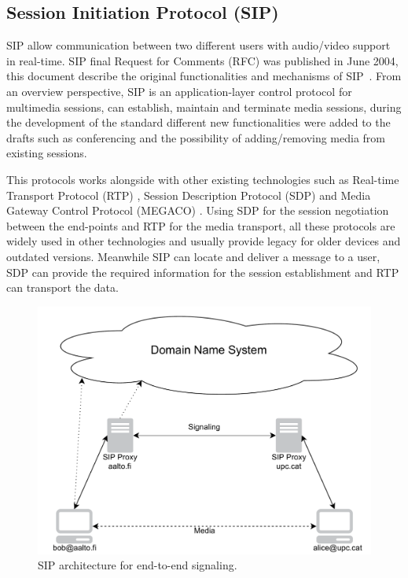 \subsection{Session Initiation Protocol (SIP) }

SIP allow communication between two different users with audio/video support in real-time. SIP final Request for Comments (RFC)  was published in June 2004, this document describe the original functionalities and mechanisms of SIP~\cite{sipRFC}. From an overview perspective, SIP is an application-layer control protocol for multimedia sessions, can establish, maintain and terminate media sessions, during the development of the standard different new functionalities were added to the drafts such as conferencing and the possibility of adding/removing media from existing sessions. 


This protocols works alongside with other existing technologies such as Real-time Transport Protocol (RTP) , Session Description Protocol (SDP)  and Media Gateway Control Protocol (MEGACO) . Using SDP for the session negotiation between the end-points and RTP for the media transport, all these protocols are widely used in other technologies and usually provide legacy for older devices and outdated versions. Meanwhile SIP can locate and deliver a message to a user, SDP can provide the required information for the session establishment and RTP can transport the data.

\begin{figure}[h]
  \centering
    \includegraphics[width=1\textwidth]{./figures/SIParchitecture.pdf}
      \caption[SIP architecture for end-to-end signaling]{SIP architecture for end-to-end signaling.}
	\label{fig:SIParchitecture}
\end{figure}

